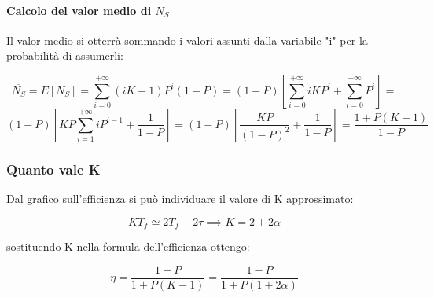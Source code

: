 \paragraph{Calcolo del valor medio di $N_S$}

Il valor medio si otterrà sommando i valori assunti dalla variabile "i" per la probabilità di assumerli:

\begin{equation*}
\overline{N_S} = E[N_S] = \sum_{i=0}^{+\infty} (iK + 1) P^i (1-P) = (1-P) \left[ \sum_{i=0}^{+\infty} iK P^i + \sum_{i=0}^{+\infty} P^i \right] =
\end{equation*}
\begin{equation*}
(1-P) \left[ KP \sum_{i=1}^{+\infty} i P^{i-1} + \frac{1}{1-P} \right] = (1-P) \left[ \frac{KP}{(1-P)^2} + \frac{1}{1-P} \right] = \frac{1 + P(K-1)}{1-P}
\end{equation*}

\subsubsection{Quanto vale K}
Dal grafico sull'efficienza si può individuare il valore di K approssimato:

\begin{equation}
KT_f \simeq 2T_f + 2\tau \implies K = 2 + 2\alpha
\end{equation}

sostituendo K nella formula dell'efficienza ottengo:

\begin{equation}
\eta = \frac{1-P}{1 + P(K-1)} = \frac{1-P}{1 + P(1 + 2\alpha)}
\end{equation}


\newpage


